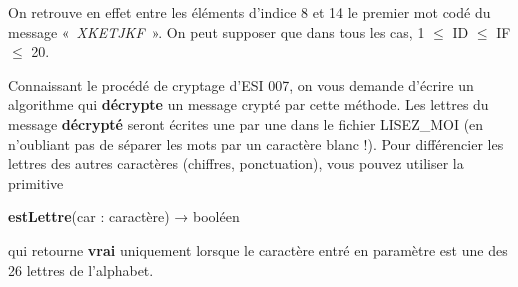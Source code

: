 \bigskip

{
On retrouve en effet entre les éléments d’indice 8 et 14 le premier mot
codé du message «~\textit{XKETJKF~}». On peut supposer que dans tous
les cas, 1 ${\leq}$ ID ${\leq}$ IF ${\leq}$ 20.}

{
Connaissant le procédé de cryptage d’ESI 007, on vous demande d’écrire
un algorithme qui \textbf{décrypte} un message crypté par cette
méthode. Les lettres du message \textbf{décrypté} seront écrites une
par une dans le fichier LISEZ\_MOI (en n’oubliant pas de séparer les
mots par un caractère blanc !). Pour différencier les lettres des
autres caractères (chiffres, ponctuation), vous pouvez utiliser la
primitive}

{\sffamily
\textbf{estLettre}(car : caractère) \textrm{→}\textrm{ }booléen }

{
qui retourne \textbf{vrai} uniquement lorsque le caractère entré en
paramètre est une des 26 lettres de l’alphabet.}


\bigskip


\bigskip
